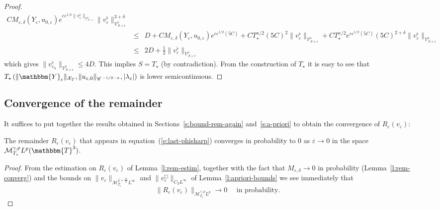 \begin{proof}
\begin{eqnarray*}
    CM_{\varepsilon, \delta} (Y_{\varepsilon}, u_{0, \varepsilon}) e^{c
    \varepsilon^{1 / 2} \| v^{\flat}_{\varepsilon} \|_{\mathcal{V}_{S +
    \epsilon}^{\flat}}} \| v^{\flat}_{\varepsilon} \|_{\mathcal{V}^{\flat}_{S
    + \epsilon}}^{3 + \delta}\\
    & \leqslant & D + CM_{\varepsilon, \delta} (Y_{\varepsilon}, u_{0,
    \varepsilon}) e^{c \varepsilon^{1 / 2} (5 C)} + CT_{\star}^{\kappa / 2} (5
    C)^2 \| v^{\flat}_{\varepsilon} \|_{\mathcal{V}^{\flat}_{S + \epsilon}} +
    CT_{\star}^{\kappa / 2} e^{c \varepsilon^{1 / 2} (5 C)} (5 C)^{2 + \delta}
    \| v^{\flat}_{\varepsilon} \|_{\mathcal{V}^{\flat}_{S + \epsilon}}\\
    & \leqslant & 2 D + \frac{1}{2} \| v^{\flat}_{\varepsilon}
    \|_{\mathcal{V}^{\flat}_{S + \epsilon}}
  \end{eqnarray*}
  which gives $\| v^{\flat}_{\varepsilon_n} \|_{\mathcal{V}_{S +
  \epsilon}^{\flat}} \leqslant 4 D$. This implies $S = T_{\star}$ (by
  contradiction). From the construction of $T_{\star}$ it is easy to see that
  $T_{\star} \left( \| \mathbbm{Y}_{\varepsilon} \|_{\mathcal{X}_T}, \|
  u_{\varepsilon, 0} \|_{\CC^{- 1 / 2 - \kappa}}, | \lambda_{\varepsilon} |
  \right)$ is lower semicontinuous.
\end{proof}

\subsection{\label{s:conv-rem}Convergence of the remainder}

It suffices to put together the results obtained in
Sections~\ref{s:bound-rem-again} and~\ref{s:a-priori} to obtain the
convergence of $R_{\varepsilon} (v_{\varepsilon})$:

\begin{lemma}
  \label{l:remconv-last}The remainder $R_{\varepsilon} (v_{\varepsilon})$ that
  appears in equation~(\ref{e:last-phisharp}) converges in probability to $0$
  as $\varepsilon \rightarrow 0$ in the space $\mathcal{M}^{\gamma,
  p}_{T_{\star}} L^p (\mathbbm{T}^3)$.
\end{lemma}

\begin{proof}
  From the estimation on $R_{\varepsilon} (v_{\varepsilon})$ of
  Lemma~\ref{l:rem-estim}, together with the fact that $M_{\varepsilon,
  \delta} \rightarrow 0$ in probability (Lemma~\ref{l:rem-converg}) and the
  bounds on $\| v_{\varepsilon} \|_{\mathcal{M}_{T_{\star}}^{\frac{1}{4} +
  \frac{3 \kappa}{2}} L^{\infty}}$ and $\| v_{\varepsilon}^{\Box} \|_{C_T
  L^{\infty}}$ of Lemma~\ref{l:apriori-bounds} we see immediately that 
  $$
  \|
  R_{\varepsilon} (v_{\varepsilon}) \|_{\mathcal{M}^{\gamma, p}_{T_{\star}}
  L^p} \rightarrow 0 \quad \mbox{ in probability.}
  $$ 
\end{proof}

